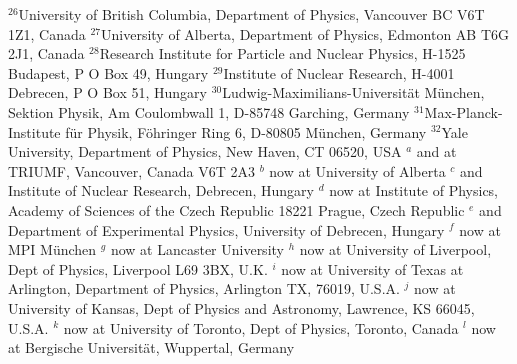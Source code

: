 {\newline
$^{ 26}$University of British Columbia, Department of Physics,
Vancouver BC V6T 1Z1, Canada
\newline
$^{ 27}$University of Alberta,  Department of Physics,
Edmonton AB T6G 2J1, Canada
\newline
$^{ 28}$Research Institute for Particle and Nuclear Physics,
H-1525 Budapest, P O  Box 49, Hungary
\newline
$^{ 29}$Institute of Nuclear Research,
H-4001 Debrecen, P O  Box 51, Hungary
\newline
$^{ 30}$Ludwig-Maximilians-Universit\"at M\"unchen,
Sektion Physik, Am Coulombwall 1, D-85748 Garching, Germany
\newline
$^{ 31}$Max-Planck-Institute f\"ur Physik, F\"ohringer Ring 6,
D-80805 M\"unchen, Germany
\newline
$^{ 32}$Yale University, Department of Physics, New Haven, 
CT 06520, USA
\newline
\bigskip\newline
$^{  a}$ and at TRIUMF, Vancouver, Canada V6T 2A3
\newline
$^{  b}$ now at University of Alberta
\newline
$^{  c}$ and Institute of Nuclear Research, Debrecen, Hungary
\newline
$^{  d}$ now at Institute of Physics, Academy of Sciences of the Czech Republic
18221 Prague, Czech Republic
\newline 
$^{  e}$ and Department of Experimental Physics, University of Debrecen, 
Hungary
\newline
$^{  f}$ now at MPI M\"unchen
\newline
$^{  g}$ now at Lancaster University
\newline
$^{  h}$ now at University of Liverpool, Dept of Physics,
Liverpool L69 3BX, U.K.
\newline
$^{  i}$ now at University of Texas at Arlington, Department of Physics,
Arlington TX, 76019, U.S.A. 
\newline
$^{  j}$ now at University of Kansas, Dept of Physics and Astronomy,
Lawrence, KS 66045, U.S.A.
\newline
$^{  k}$ now at University of Toronto, Dept of Physics, Toronto, Canada 
\newline
$^{  l}$ now at Bergische Universit\"at, Wuppertal, Germany
}
